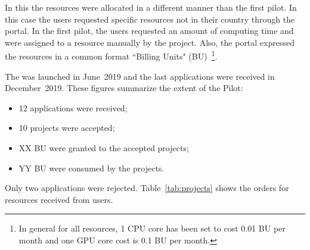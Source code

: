 In this \pilot the resources were allocated in a different manner than the first pilot.
In this case the users requested specific resources not in their country through the portal. 
In the first pilot, the users requested an amount of computing time and were assigned to a resource manually by the \dell project.
Also, the portal expressed the \einfra resources in a common format ``Billing Units" (BU)~\footnote{In general for all \dell resources, 1 CPU core has been set to cost 0.01 BU per month and one GPU core cost is 0.1 BU per month.}.

The \dell \pilot was launched in June~2019 and the last applications were received in December~2019. 
These figures summarize the extent of the Pilot:
\begin{itemize}
\item 12 applications were received;
\item 10 projects were accepted;
\item XX BU were granted to the accepted projects;
\item YY BU were consumed by the projects.
\end{itemize}
Only two applications were rejected. 
Table~\ref{tab:projects} shows the orders for resources received from users.
